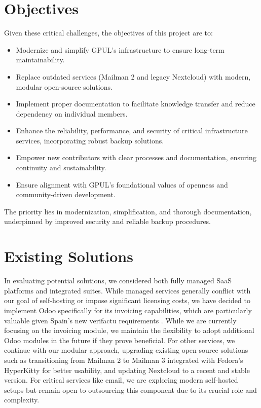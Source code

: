 \section{Objectives}

Given these critical challenges, the objectives of this project are to:

\begin{itemize}
    \item Modernize and simplify GPUL's infrastructure to ensure long-term maintainability.
    \item Replace outdated services (Mailman 2 and legacy Nextcloud) with modern, modular open-source solutions.
    \item Implement proper documentation to facilitate knowledge transfer and reduce dependency on individual members.
    \item Enhance the reliability, performance, and security of critical infrastructure services, incorporating robust backup solutions.
    \item Empower new contributors with clear processes and documentation, ensuring continuity and sustainability.
    \item Ensure alignment with GPUL's foundational values of openness and community-driven development.
\end{itemize}

The priority lies in modernization, simplification, and thorough documentation, underpinned by improved security and reliable backup procedures.

\section{Existing Solutions}

In evaluating potential solutions, we considered both fully managed SaaS platforms and integrated suites. While managed services generally conflict with our goal of self-hosting or impose significant licensing costs, we have decided to implement Odoo \cite{odoo_web} specifically for its invoicing capabilities, which are particularly valuable given Spain's new \gls{verifactu} requirements \cite{BOE-A-2024-22138}. While we are currently focusing on the invoicing module, we maintain the flexibility to adopt additional Odoo modules in the future if they prove beneficial. For other services, we continue with our modular approach, upgrading existing open-source solutions such as transitioning from Mailman 2 to Mailman 3 integrated with Fedora's HyperKitty \cite{hyperkitty_web} for better usability, and updating Nextcloud to a recent and stable version. For critical services like email, we are exploring modern self-hosted setups but remain open to outsourcing this component due to its crucial role and complexity.


